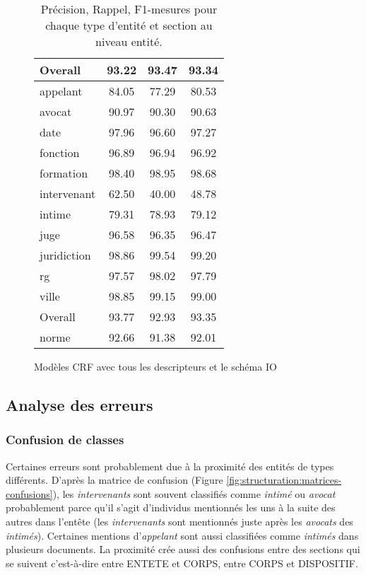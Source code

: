 \begin{table}[!h]
\begin{subfigure}[t]{0.45\textwidth}
\begin{tabular}{|l|ccc|}
Overall &   93.22 &  93.47 &  93.34 \\\hline
 \noalign{\smallskip}\hline\noalign{\smallskip}
appelant &   84.05 &  77.29 &  80.53 \\
avocat  &   90.97 &  90.30 &  90.63 \\
date    &   97.96 &  96.60 &  97.27 \\
fonction &   96.89 &  96.94 &  96.92 \\
formation &   98.40 &  98.95 &  98.68 \\
intervenant &   62.50 &  40.00 &  48.78 \\
intime  &   79.31 &  78.93 &  79.12 \\
juge    &   96.58 &  96.35 &  96.47 \\
juridiction &   98.86 &  99.54 &  99.20 \\
rg      &   97.57 &  98.02 &  97.79 \\
ville   &   98.85 &  99.15 &  99.00 \\\hline
Overall &   93.77 &  92.93 &  93.35 \\\hline
 \noalign{\smallskip}\hline\noalign{\smallskip}
norme   &   92.66 &  91.38 &  92.01 \\\hline
\end{tabular}
\caption{Modèles CRF avec tous les descripteurs et le schéma IO}\label{tab:structuration:perf-detail-entity-crf}
\end{subfigure} 
\caption{Précision, Rappel, F1-mesures pour chaque type d'entité et section au niveau entité.}\label{tab:structuration:perf-detail-entity}
\end{table}


\subsection{Analyse des erreurs}
\subsubsection{Confusion de classes}
Certaines erreurs sont probablement due à la proximité des entités de types différents. D'après la matrice de confusion (Figure \ref{fig:structuration:matrices-confusions}), les \textit{intervenants} sont souvent classifiés comme \textit{intimé} ou \textit{avocat} probablement parce qu'il s'agit d'individus mentionnés les uns à la suite des autres dans l'entête (les \textit{intervenants} sont mentionnés juste après les \textit{avocats} des \textit{intimés}). Certaines mentions d'\textit{appelant} sont aussi classifiées comme \textit{intimés} dans plusieurs documents. La proximité crée aussi des confusions entre des sections qui se suivent c'est-à-dire entre ENTETE et CORPS, entre CORPS et DISPOSITIF.  

